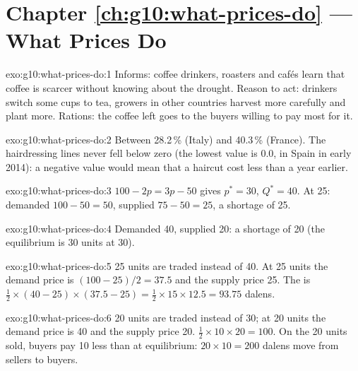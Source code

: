 \section*{Chapter \ref{ch:g10:what-prices-do} --- What Prices Do}

\begin{solution}{exo:g10:what-prices-do:1}
Informs: coffee drinkers, roasters and cafés learn that coffee is scarcer without knowing about the drought. Reason to act: drinkers switch some cups to tea,
growers in other countries harvest more carefully and plant more. Rations: the coffee left goes to the buyers willing to pay most for it.
\end{solution}

\begin{solution}{exo:g10:what-prices-do:2}
Between 28.2\,\% (Italy) and 40.3\,\% (France). The hairdressing lines never fell below zero (the lowest value is 0.0, in Spain in early 2014): a negative value would
mean that a haircut cost less than a year earlier.
\end{solution}

\begin{solution}{exo:g10:what-prices-do:3}
$100 - 2p = 3p - 50$ gives $p^* = 30$, $Q^* = 40$. At 25: demanded $100 - 50 = 50$, supplied $75 - 50 = 25$, a shortage of 25.
\end{solution}

\begin{solution}{exo:g10:what-prices-do:4}
Demanded 40, supplied 20: a shortage of 20 (the equilibrium is 30 units at 30).
\end{solution}

\begin{solution}{exo:g10:what-prices-do:5}
25 units are traded instead of 40. At 25 units the demand price is $(100 - 25)/2 = 37.5$ and the supply price 25. The  is $\tfrac12 \times (40 - 25) \times
(37.5 - 25) = \tfrac12 \times 15 \times 12.5 = 93.75$ dalens.
\end{solution}

\begin{solution}{exo:g10:what-prices-do:6}
20 units are traded instead of 30; at 20 units the demand price is 40 and the supply price 20.  $\tfrac12 \times 10 \times 20 = 100$. On the 20 units sold,
buyers pay 10 less than at equilibrium: $20 \times 10 = 200$ dalens move from sellers to buyers.
\end{solution}


